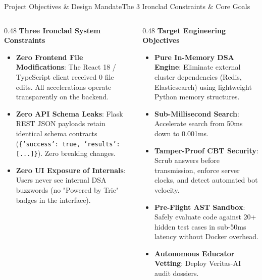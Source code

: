 \documentclass[aspectratio=169,10pt]{beamer}
\begin{document}
\begin{frame}[t]{Project Objectives \& Design Mandate}{The 3 Ironclad Constraints \& Core Goals}
  \begin{columns}[t]
    \begin{column}{0.48\textwidth}
      {\fontsize{9.0}{11.0}\selectfont\textbf{\textcolor{KoinexaRed}{Three Ironclad System Constraints}}}\par\vspace{1.5pt}
      \begin{itemize}\setlength{\itemsep}{2.0pt}
        \item {\fontsize{8.0}{9.8}\selectfont \textbf{Zero Frontend File Modifications}: The React 18 / TypeScript client received 0 file edits. All accelerations operate transparently on the backend.}
        \item {\fontsize{8.0}{9.8}\selectfont \textbf{Zero API Schema Leaks}: Flask REST JSON payloads retain identical schema contracts (\texttt{\{'success': true, 'results': [...]\}}). Zero breaking changes.}
        \item {\fontsize{8.0}{9.8}\selectfont \textbf{Zero UI Exposure of Internals}: Users never see internal DSA buzzwords (no "Powered by Trie" badges in the interface).}
      \end{itemize}
    \end{column}
    \begin{column}{0.48\textwidth}
      {\fontsize{9.0}{11.0}\selectfont\textbf{\textcolor{KoinexaOrange}{Target Engineering Objectives}}}\par\vspace{1.5pt}
      \begin{itemize}\setlength{\itemsep}{1.8pt}
        \item {\fontsize{8.0}{9.8}\selectfont \textbf{Pure In-Memory DSA Engine}: Eliminate external cluster dependencies (Redis, Elasticsearch) using lightweight Python memory structures.}
        \item {\fontsize{8.0}{9.8}\selectfont \textbf{Sub-Millisecond Search}: Accelerate search from 50ms down to 0.001ms.}
        \item {\fontsize{8.0}{9.8}\selectfont \textbf{Tamper-Proof CBT Security}: Scrub answers before transmission, enforce server clocks, and detect automated bot velocity.}
        \item {\fontsize{8.0}{9.8}\selectfont \textbf{Pre-Flight AST Sandbox}: Safely evaluate code against 20+ hidden test cases in sub-50ms latency without Docker overhead.}
        \item {\fontsize{8.0}{9.8}\selectfont \textbf{Autonomous Educator Vetting}: Deploy Veritas-AI audit dossiers.}
      \end{itemize}
    \end{column}
  \end{columns}
\end{frame}
\end{document}
